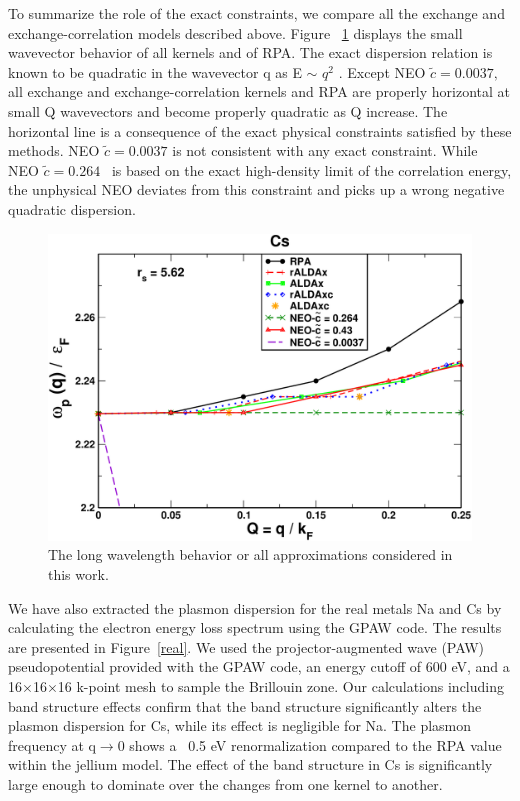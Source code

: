 \documentclass[aps,amsmath,amssymb, preprint, 12pt]{revtex4-1}
\begin{document}
To summarize the role of the exact constraints, we compare all the exchange and exchange-correlation models described above. Figure ~\ref{fig4} displays the small wavevector behavior of all kernels and of RPA. The exact dispersion relation is known to be quadratic in the wavevector q as E $ \sim $   \( q^{2} \) . Except NEO  \( \widetilde{c}=0.0037, \)  all exchange and exchange-correlation kernels and RPA are properly horizontal at small Q wavevectors and become properly quadratic as Q increase. The horizontal line is a consequence of the exact physical constraints satisfied by these methods. NEO  \( \widetilde{c}=0.0037 \)  is not consistent with any exact constraint. While NEO  \( \widetilde{c}=0.264 \) \ is based on the exact high-density limit of the correlation energy, the unphysical NEO deviates from this constraint and picks up a wrong negative quadratic dispersion. \\

\begin{figure}[h!]	
	\centering
	\includegraphics[scale=0.4]{figure_7.pdf}
	\caption{The long wavelength behavior or all approximations considered in this work.}
	\label{fig4}
\end{figure}



We have also extracted the plasmon dispersion for the real metals Na and Cs by calculating the electron energy loss spectrum using the GPAW\cite{gpaw1, gpaw2, gpaw_response, ase} code. The results are presented in Figure~\ref{real}. We used the projector-augmented wave (PAW)\cite{B94} pseudopotential provided with the GPAW code, an energy cutoff of 600 eV, and a 16$\times$16$\times$16 k-point mesh to sample the Brillouin zone. Our calculations including band structure effects confirm that the band structure significantly alters the plasmon dispersion for Cs, while its effect is negligible for Na. The plasmon frequency at q$\rightarrow$0 shows a ~0.5 eV renormalization compared to the RPA value within the jellium model. The effect of the band structure in Cs is significantly large enough to dominate over the changes from one kernel to another.
\end{document}

